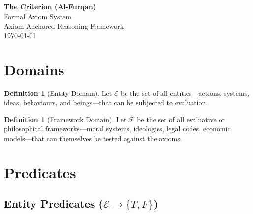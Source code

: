 \documentclass[11pt,a4paper]{article}
\theoremstyle{definition}
\newtheorem{definition}[axiom]{Definition}
\newcommand{\E}{\mathcal{E}}      %
\newcommand{\F}{\mathcal{F}}      %
\begin{document}
\begin{center}
    {\LARGE\bfseries The Criterion (Al-Furqan)}\\[6pt]
    {\Large Formal Axiom System}\\[12pt]
    {\large Axiom-Anchored Reasoning Framework}\\[6pt]
    \today
\end{center}

\vspace{1em}

\begin{abstract}
This document presents the formal mathematical foundation of The Criterion
(\textit{Al-Furqan}), an axiom-anchored reasoning framework.  The system is
built on three core axioms and two derived proofs, encoded in first-order
logic and verified for satisfiability using the Z3 SMT solver.  Four
survival gates operationalize the axioms as concrete testable predicates.
\end{abstract}

\tableofcontents
\newpage

\section{Domains}

\begin{definition}[Entity Domain]
Let $\E$ be the set of all entities---actions, systems, ideas, behaviours,
and beings---that can be subjected to evaluation.
\end{definition}

\begin{definition}[Framework Domain]
Let $\F$ be the set of all evaluative or philosophical frameworks---moral
systems, ideologies, legal codes, economic models---that can themselves be
tested against the axioms.
\end{definition}

\section{Predicates}

\subsection{Entity Predicates ($\E \to \{T, F\}$)}
\end{document}
